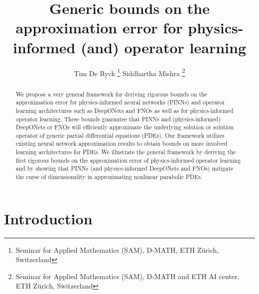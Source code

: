 \documentclass{article}
\title{Generic bounds on the approximation error for physics-informed (and) operator learning}
\author{
Tim De Ryck
\thanks{Seminar for Applied Mathematics (SAM), D-MATH, ETH Z\"urich, Switzerland} \AND
Siddhartha Mishra
\thanks{
Seminar for Applied Mathematics (SAM), D-MATH and ETH AI center, 
ETH Zürich, Switzerland
}
}
\numberwithin{equation}{section}
\newcommand{\1}{\mathbbm{1}}
\begin{document}
\maketitle


\begin{abstract}
We propose a very general framework for deriving rigorous bounds on the approximation error for physics-informed neural networks (PINNs) and operator learning architectures such as DeepONets and FNOs as well as for physics-informed operator learning. These bounds guarantee that PINNs and (physics-informed) DeepONets or FNOs will efficiently approximate the underlying solution or solution operator of generic partial differential equations (PDEs). Our framework utilizes existing neural network approximation results to obtain bounds on more involved learning architectures for PDEs. We illustrate the general framework by deriving the first rigorous bounds on the approximation error of physics-informed operator learning and by showing that PINNs (and physics-informed DeepONets and FNOs) mitigate the curse of dimensionality in approximating nonlinear parabolic PDEs. 
\end{abstract}

\section{Introduction}

\end{document}
